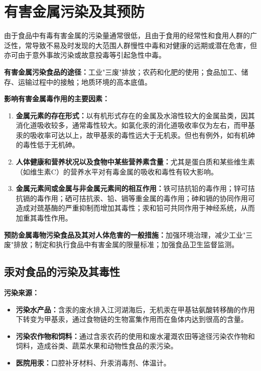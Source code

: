 \section{有害金属污染及其预防}

\begin{keybox}
由于食品中有毒有害金属的污染量通常很低，且由于食用的经常性和食用人群的广泛性，常导致不易及时发现的大范围人群慢性中毒和对健康的远期或潜在危害，但亦可由于意外事故污染或故意投毒等引起急性中毒。

\textbf{有害金属污染食品的途径：}工业"三废"排放；农药和化肥的使用；食品加工、储存、运输过程中的接触；地质环境的高本底值。

\textbf{影响有害金属毒作用的主要因素：}
\begin{enumerate}[leftmargin=*]
    \item \textbf{金属元素的存在形式：}以有机形式存在的金属及水溶性较大的金属盐类，因其消化道吸收较多，通常毒性较大。如氯化汞的消化道吸收率仅为左右，而甲基汞的吸收率可达以上，故甲基汞的毒性远大于无机汞。但也有例外，如有机砷的毒性低于无机砷。
    \item \textbf{人体健康和营养状况以及食物中某些营养素含量：}尤其是蛋白质和某些维生素（如维生素C）的营养水平对有毒金属的吸收和毒性有较大影响。
    \item \textbf{金属元素间或金属与非金属元素间的相互作用：}铁可拮抗铅的毒作用；锌可拮抗镉的毒作用；硒可拮抗汞、铅、镉等重金属的毒作用；砷和镉的协同作用可造成对巯基酶的严重抑制而增加其毒性；汞和铅可共同作用于神经系统，从而加重其毒性作用。
\end{enumerate}

\textbf{预防金属毒物污染食品及其对人体危害的一般措施：}加强环境治理，减少工业"三废"排放；制定和执行食品中有害金属的限量标准；加强食品卫生监督监测。

\subsection{汞对食品的污染及其毒性}

\textbf{污染来源：}
\begin{itemize}[leftmargin=*]
    \item \textbf{污染水产品：}含汞的废水排入江河湖海后，无机汞在甲基钴氨酸转移酶的作用下转变为甲基汞，通过食物链的生物富集作用而在鱼体内达到很高的含量。
    \item \textbf{污染农作物和饲料：}通过含汞农药的使用和废水灌溉农田等途径污染农作物和饲料，造成谷类、蔬菜水果和动物性食品的汞污染。
    \item \textbf{医院用汞：}口腔补牙材料、升汞消毒剂、体温计。
\end{itemize}


\end{keybox}
